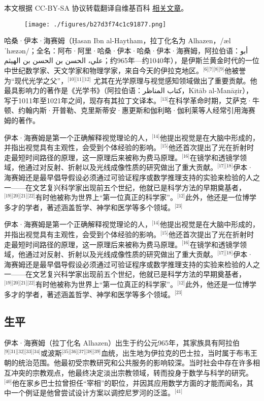 
本文根据 CC-BY-SA 协议转载翻译自维基百科 \href{https://en.wikipedia.org/wiki/Ibn_al-Haytham}{相关文章}。

\begin{figure}[ht]
\centering
\texttt{[image: ./figures/b27d3f74c1c91877.png]}
\caption{} \label{fig_YBH_7}
\end{figure}
哈桑·伊本·海赛姆（Ḥasan Ibn al-Haytham，拉丁化名为 Alhazen，/ælˈhæzən/；全名：阿布·阿里·哈桑·伊本·哈桑·伊本·海赛姆，阿拉伯语：أبو علي، الحسن بن الحسن بن الهيثم；约965年—约1040年），是伊斯兰黄金时代的一位中世纪数学家、天文学家和物理学家，来自今天的伊拉克地区。\(^\text{[6][7][8][9]}\)他被誉为“现代光学之父”，\(^\text{[10][11][12]}\) 尤其在光学原理与视觉感知领域做出了重要贡献。他最具影响力的著作是《光学书》（阿拉伯语：كتاب المناظر，Kitāb al-Manāẓir），写于1011年至1021年之间，现存有其拉丁文译本。\(^\text{[13]}\)在科学革命时期，艾萨克·牛顿、约翰内斯·开普勒、克里斯蒂安·惠更斯和伽利略·伽利莱等人经常引用海赛姆的著作。

伊本·海赛姆是第一个正确解释视觉理论的人，\(^\text{[14]}\)他提出视觉是在大脑中形成的，并指出视觉具有主观性，会受到个体经验的影响。\(^\text{[15]}\)他还首次提出了光在折射时走最短时间路径的原理，这一原理后来被称为费马原理。\(^\text{[16]}\)在镜学和透镜学领域，他通过对反射、折射以及光线成像性质的研究做出了重大贡献。\(^\text{[17][18]}\)伊本·海赛姆还是最早倡导假设必须通过可验证程序或数学推理支持的实验来检验的人之一——在文艺复兴科学家出现前五个世纪，他就已是科学方法的早期奠基者，\(^\text{[19][20][21][22]}\)有时他被称为世界上“第一位真正的科学家”。\(^\text{[12]}\)此外，他还是一位博学多才的学者，著述涵盖哲学、神学和医学等多个领域。\(^\text{[23]}\)

伊本·海赛姆是第一个正确解释视觉理论的人，\(^\text{[14]}\)他提出视觉是在大脑中形成的，并指出视觉具有主观性，会受到个体经验的影响。\(^\text{[15]}\)他还首次提出了光在折射时走最短时间路径的原理，这一原理后来被称为费马原理。\(^\text{[16]}\)在镜学和透镜学领域，他通过对反射、折射以及光线成像性质的研究做出了重大贡献。\(^\text{[17][18]}\)伊本·海赛姆还是最早倡导假设必须通过可验证程序或数学推理支持的实验来检验的人之一——在文艺复兴科学家出现前五个世纪，他就已是科学方法的早期奠基者，\(^\text{[19][20][21][22]}\)有时他被称为世界上“第一位真正的科学家”。\(^\text{[12]}\)此外，他还是一位博学多才的学者，著述涵盖哲学、神学和医学等多个领域。\(^\text{[23]}\)
\subsection{生平}
伊本·海赛姆（拉丁化名 Alhazen）出生于约公元965年，其家族具有阿拉伯\(^\text{[9][31][32][33][34]}\)或波斯\(^\text{[35][36][37][38][39]}\)血统，出生地为伊拉克的巴士拉，当时属于布韦王朝的统治范围。他最初受宗教研究和公共服务的影响较深。当时社会中存在许多相互冲突的宗教观点，他最终决定淡出宗教领域，转而投身于数学与科学的研究。\(^\text{[40]}\)他在家乡巴士拉曾担任“宰相”的职位，并因其应用数学方面的才能而闻名，其中一个例证是他曾尝试设计方案以调控尼罗河的泛滥。\(^\text{[41]}\)

